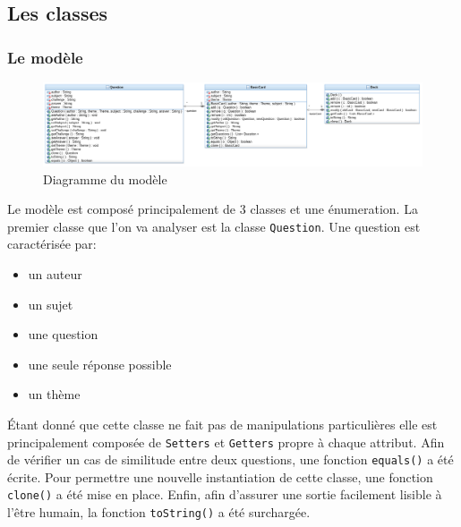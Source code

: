 \newpage
\subsection{Les classes}

\subsubsection{Le modèle}
\begin{figure}[h]
	\centering
	\includegraphics[width=\textwidth]{ttmc_modele.png}
	\caption{Diagramme du modèle}
	\label{fig:diag_modele}
\end{figure}

Le modèle est composé principalement de 3 classes et une énumeration.
La premier classe que l'on va analyser est la classe \verb|Question|.
Une question est caractérisée par:
\begin{itemize}
\item un auteur
\item un sujet
\item une question
\item une seule réponse possible
\item un thème
\end{itemize}

Étant donné que cette classe ne fait pas de manipulations particulières elle est principalement composée de \verb|Setters| et \verb|Getters| propre à chaque attribut.
Afin de vérifier un cas de similitude entre deux questions, une fonction \verb|equals()| a été écrite.
Pour permettre une nouvelle instantiation de cette classe, une fonction \verb|clone()| a été mise en place.
Enfin, afin d'assurer une sortie facilement lisible à l'être humain, la fonction \verb|toString()| a été surchargée.\\

